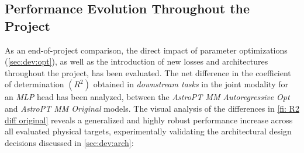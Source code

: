 \subsection{Performance Evolution Throughout the Project}

As an end-of-project comparison, the direct impact of parameter optimizations (\cref{sec:dev:opt}), as well as the introduction of new losses and architectures throughout the project, has been evaluated. The net difference in the coefficient of determination $\left(R^2\right)$ obtained in \textit{downstream tasks} in the joint modality for an \textit{\gls{MLP}} head has been analyzed, between the \textit{AstroPT MM Autoregressive Opt} and \textit{AstroPT MM Original} models. The visual analysis of the differences in \cref{fi: R2 diff original} reveals a generalized and highly robust performance increase across all evaluated physical targets, experimentally validating the architectural design decisions discussed in \cref{sec:dev:arch}:

